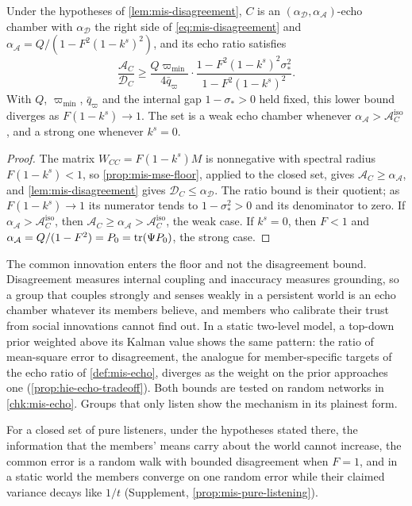 \begin{theorem}\label{thm:mis-echo-chambers}
Under the hypotheses of \cref{lem:mis-disagreement}, $C$ is an $(\alpha_{\mathcal D},\alpha_{\mathcal A})$-echo chamber with $\alpha_{\mathcal D}$ the right side of \eqref{eq:mis-disagreement} and $\alpha_{\mathcal A}=Q/(1-F^2(1-k^s)^2)$, and its echo ratio satisfies
\begin{equation}\label{eq:mis-echo-ratio}
\frac{\mathcal A_C}{\mathcal D_C}\ge\frac{Q\varpi_{\min}}{4\bar q_\varpi}\cdot\frac{1-F^2(1-k^s)^2\sigma_\ast^2}{1-F^2(1-k^s)^2}.
\end{equation}
With $Q$, $\varpi_{\min}$, $\bar q_\varpi$ and the internal gap $1-\sigma_\ast>0$ held fixed, this lower bound diverges as $F(1-k^s)\to1$. The set is a weak echo chamber whenever $\alpha_{\mathcal A}>\mathcal A^{\mathrm{iso}}_C$, and a strong one whenever $k^s=0$.
\end{theorem}
\begin{proof}
The matrix $W_{CC}=F(1-k^s)M$ is nonnegative with spectral radius $F(1-k^s)<1$, so \cref{prop:mis-mse-floor}, applied to the closed set, gives $\mathcal A_C\ge\alpha_{\mathcal A}$, and \cref{lem:mis-disagreement} gives $\mathcal D_C\le\alpha_{\mathcal D}$. The ratio bound is their quotient; as $F(1-k^s)\to1$ its numerator tends to $1-\sigma_\ast^2>0$ and its denominator to zero. If $\alpha_{\mathcal A}>\mathcal A^{\mathrm{iso}}_C$, then $\mathcal A_C\ge\alpha_{\mathcal A}>\mathcal A^{\mathrm{iso}}_C$, the weak case. If $k^s=0$, then $F<1$ and $\alpha_{\mathcal A}=Q/(1-F^2)=P_0=\operatorname{tr}(\Psi P_0)$, the strong case.
\end{proof}

The common innovation enters the floor and not the disagreement bound. Disagreement measures internal coupling and inaccuracy measures grounding, so a group that couples strongly and senses weakly in a persistent world is an echo chamber whatever its members believe, and members who calibrate their trust from social innovations cannot find out. In a static two-level model, a top-down prior weighted above its Kalman value shows the same pattern: the ratio of mean-square error to disagreement, the analogue for member-specific targets of the echo ratio of \cref{def:mis-echo}, diverges as the weight on the prior approaches one (\cref{prop:hie-echo-tradeoff}). Both bounds are tested on random networks in \cref{chk:mis-echo}. Groups that only listen show the mechanism in its plainest form.

For a closed set of pure listeners, under the hypotheses stated there, the information that the members' means carry about the world cannot increase, the common error is a random walk with bounded disagreement when $F=1$, and in a static world the members converge on one random error while their claimed variance decays like $1/t$ (Supplement, \cref{prop:mis-pure-listening}).

